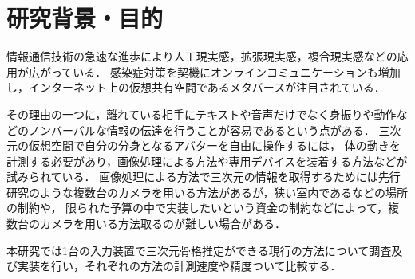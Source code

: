 \documentclass[titlepage]{jarticle}
\begin{document}
\maketitle

%
%
\section{研究背景・目的}
%
情報通信技術の急速な進歩により人工現実感，拡張現実感，複合現実感などの応用が広がっている．
感染症対策を契機にオンラインコミュニケーションも増加し，インターネット上の仮想共有空間であるメタバースが注目されている\cite{meta}．

その理由の一つに，離れている相手にテキストや音声だけでなく身振りや動作などのノンバーバルな情報の伝達を行うことが容易であるという点がある．
三次元の仮想空間で自分の分身となるアバターを自由に操作するには，
体の動きを計測する必要があり，画像処理による方法\cite{CV}や専用デバイスを装着する方法\cite{キャプチャ}などが試みられている．
画像処理による方法で三次元の情報を取得するためには先行研究のような複数台のカメラを用いる方法\cite{turugi}があるが，狭い室内であるなどの場所の制約や，
限られた予算の中で実装したいという資金の制約などによって，複数台のカメラを用いる方法取るのが難しい場合がある．

本研究では1台の入力装置で三次元骨格推定ができる現行の方法について調査及び実装を行い，それぞれの方法の計測速度や精度ついて比較する．

\end{document}
